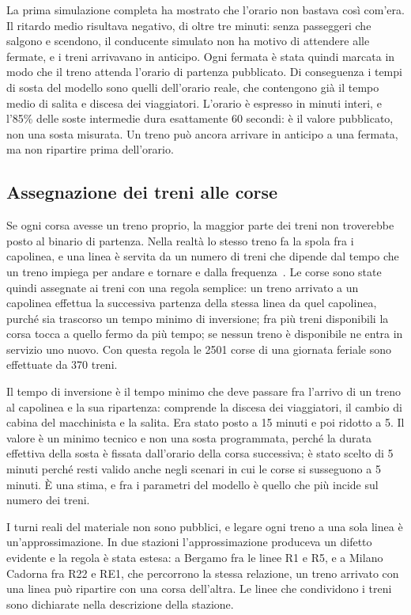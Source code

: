 La prima simulazione completa ha mostrato che l'orario non bastava così com'era. Il ritardo medio risultava negativo, di oltre tre minuti: senza passeggeri che salgono e scendono, il conducente simulato non ha motivo di attendere alle fermate, e i treni arrivavano in anticipo. Ogni fermata è stata quindi marcata in modo che il treno attenda l'orario di partenza pubblicato. Di conseguenza i tempi di sosta del modello sono quelli dell'orario reale, che contengono già il tempo medio di salita e discesa dei viaggiatori. L'orario è espresso in minuti interi, e l'85\% delle soste intermedie dura esattamente 60 secondi: è il valore pubblicato, non una sosta misurata. Un treno può ancora arrivare in anticipo a una fermata, ma non ripartire prima dell'orario.

\subsection{Assegnazione dei treni alle corse}
Se ogni corsa avesse un treno proprio, la maggior parte dei treni non troverebbe posto al binario di partenza. Nella realtà lo stesso treno fa la spola fra i capolinea, e una linea è servita da un numero di treni che dipende dal tempo che un treno impiega per andare e tornare e dalla frequenza~\cite{alfieri2006circulation}. Le corse sono state quindi assegnate ai treni con una regola semplice: un treno arrivato a un capolinea effettua la successiva partenza della stessa linea da quel capolinea, purché sia trascorso un tempo minimo di inversione; fra più treni disponibili la corsa tocca a quello fermo da più tempo; se nessun treno è disponibile ne entra in servizio uno nuovo. Con questa regola le 2501 corse di una giornata feriale sono effettuate da 370 treni.

Il tempo di inversione è il tempo minimo che deve passare fra l'arrivo di un treno al capolinea e la sua ripartenza: comprende la discesa dei viaggiatori, il cambio di cabina del macchinista e la salita. Era stato posto a 15 minuti e poi ridotto a 5. Il valore è un minimo tecnico e non una sosta programmata, perché la durata effettiva della sosta è fissata dall'orario della corsa successiva; è stato scelto di 5 minuti perché resti valido anche negli scenari in cui le corse si susseguono a 5 minuti. È una stima, e fra i parametri del modello è quello che più incide sul numero dei treni.

I turni reali del materiale non sono pubblici, e legare ogni treno a una sola linea è un'approssimazione. In due stazioni l'approssimazione produceva un difetto evidente e la regola è stata estesa: a Bergamo fra le linee R1 e R5, e a Milano Cadorna fra R22 e RE1, che percorrono la stessa relazione, un treno arrivato con una linea può ripartire con una corsa dell'altra. Le linee che condividono i treni sono dichiarate nella descrizione della stazione.

